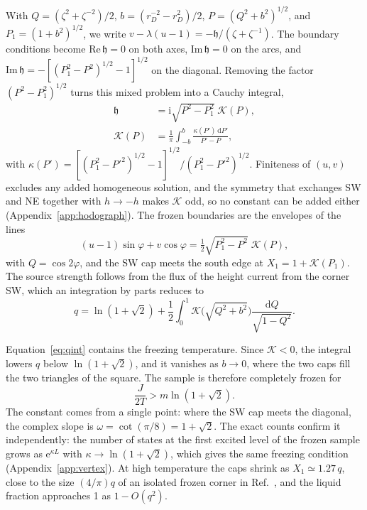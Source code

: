 \documentclass[reprint,aps,prb,floatfix,longbibliography,amsmath,amssymb]{revtex4-2}
\newcommand{\dd}{\mathrm{d}}
\newcommand{\ii}{\mathrm{i}}
\newcommand{\ee}{\mathrm{e}}
\newcommand{\cK}{\mathcal{K}}
\newcommand{\hh}{\mathfrak{h}}
\newcommand{\lnt}{\ln(1+\sqrt2)}
\begin{document}
With $Q=(\zeta^2+\zeta^{-2})/2$, $b=(r_D^{-2}-r_D^2)/2$, $P=(Q^2+b^2)^{1/2}$, and $P_1=(1+b^2)^{1/2}$, we write $v-\lambda(u-1)=-\hh/(\zeta+\zeta^{-1})$. The boundary conditions become $\mathrm{Re}\,\hh=0$ on both axes, $\mathrm{Im}\,\hh=0$ on the arcs, and $\mathrm{Im}\,\hh=-[(P_1^2-P^2)^{1/2}-1]^{1/2}$ on the diagonal. Removing the factor $(P^2-P_1^2)^{1/2}$ turns this mixed problem into a Cauchy integral,
\begin{align}\label{eq:sol}
  \hh&=\ii\sqrt{P^2-P_1^2}\;\cK(P),\nonumber\\
  \cK(P)&=\frac1\pi\int_{-b}^{b}\frac{\kappa(P')\,\dd P'}{P'-P},
\end{align}
with $\kappa(P')=[(P_1^2-P'^2)^{1/2}-1]^{1/2}/(P_1^2-P'^2)^{1/2}$. Finiteness of $(u,v)$ excludes any added homogeneous solution, and the symmetry that exchanges SW and NE together with $h\to-h$ makes $\cK$ odd, so no constant can be added either (Appendix~\ref{app:hodograph}). The frozen boundaries are the envelopes of the lines
\begin{equation}\label{eq:envelope}
  (u-1)\sin\varphi+v\cos\varphi=\tfrac12\sqrt{P_1^2-P^2}\;\cK(P),
\end{equation}
with $Q=\cos2\varphi$, and the SW cap meets the south edge at $X_1=1+\cK(P_1)$. The source strength follows from the flux of the height current from the corner SW, which an integration by parts reduces to
\begin{equation}\label{eq:qint}
  q=\lnt+\frac12\int_0^1\cK\bigl(\sqrt{Q^2+b^2}\bigr)\frac{\dd Q}{\sqrt{1-Q^2}} .
\end{equation}

Equation~\eqref{eq:qint} contains the freezing temperature. Since $\cK<0$, the integral lowers $q$ below $\lnt$, and it vanishes as $b\to0$, where the two caps fill the two triangles of the square. The sample is therefore completely frozen for
\begin{equation}\label{eq:freeze}
  \frac{J}{2T}>m\lnt .
\end{equation}
The constant comes from a single point: where the SW cap meets the diagonal, the complex slope is $\omega=\cot(\pi/8)=1+\sqrt2$. The exact counts confirm it independently: the number of states at the first excited level of the frozen sample grows as $\ee^{\kappa L}$ with $\kappa\to\lnt$, which gives the same freezing condition (Appendix~\ref{app:vertex}). At high temperature the caps shrink as $X_1\simeq1.27\,q$, close to the size $(4/\pi)q$ of an isolated frozen corner in Ref.~\cite{WonVacancies}, and the liquid fraction approaches 1 as $1-O(q^2)$.
\end{document}
